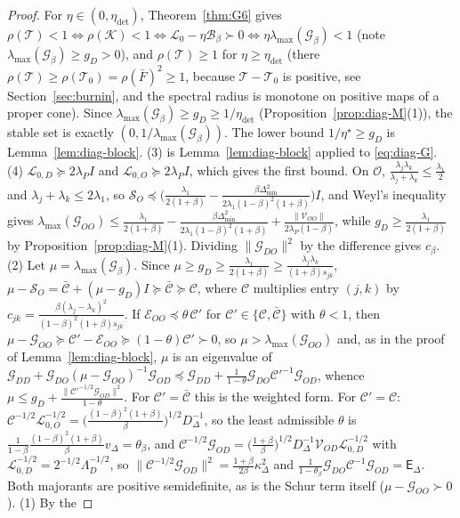 \documentclass[11pt]{article}
\theoremstyle{remark}
\begin{document}
\begin{proof}
For $\eta\in(0,\eta_{\mathrm{det}})$, Theorem~\ref{thm:G6} gives $\rho(\mathcal T)<1\iff\rho(\mathcal K)<1\iff\mathcal L_0-\eta\mathcal B_\beta\succ0\iff\eta\lambda_{\max}(\mathcal G_\beta)<1$ (note $\lambda_{\max}(\mathcal G_\beta)\ge g_D>0$), and $\rho(\mathcal T)\ge1$ for $\eta\ge\eta_{\mathrm{det}}$ (there $\rho(\mathcal T)\ge\rho(\mathcal T_0)=\rho(\bar F)^2\ge1$, because $\mathcal T-\mathcal T_0$ is positive, see Section~\ref{sec:burnin}, and the spectral radius is monotone on positive maps of a proper cone). Since $\lambda_{\max}(\mathcal G_\beta)\ge g_D\ge1/\eta_{\mathrm{det}}$ (Proposition~\ref{prop:diag-M}(1)), the stable set is exactly $(0,1/\lambda_{\max}(\mathcal G_\beta))$. The lower bound $1/\eta^\star\ge g_D$ is Lemma~\ref{lem:diag-block}. (3) is Lemma~\ref{lem:diag-block} applied to \eqref{eq:diag-G}. (4) $\mathcal L_{0,D}\succeq2\lambda_PI$ and $\mathcal L_{0,O}\succeq2\lambda_PI$, which gives the first bound. On $\mathcal O$, $\frac{\lambda_j\lambda_k}{\lambda_j+\lambda_k}\le\frac{\lambda_1}2$ and $\lambda_j+\lambda_k\le2\lambda_1$, so $\mathcal S_O\preceq\big(\frac{\lambda_1}{2(1+\beta)}-\frac{\beta\Delta_{\min}^2}{2\lambda_1(1-\beta)^2(1+\beta)}\big)I$, and Weyl's inequality gives $\lambda_{\max}(\mathcal G_{OO})\le\frac{\lambda_1}{2(1+\beta)}-\frac{\beta\Delta_{\min}^2}{2\lambda_1(1-\beta)^2(1+\beta)}+\frac{\|\mathcal V_{OO}\|}{2\lambda_P(1-\beta)}$, while $g_D\ge\frac{\lambda_1}{2(1+\beta)}$ by Proposition~\ref{prop:diag-M}(1). Dividing $\|\mathcal G_{DO}\|^2$ by the difference gives $c_\beta$. (2) Let $\mu=\lambda_{\max}(\mathcal G_\beta)$. Since $\mu\ge g_D\ge\frac{\lambda_1}{2(1+\beta)}\ge\frac{\lambda_j\lambda_k}{(1+\beta)s_{jk}}$, $\mu-\mathcal S_O=\bar{\mathcal C}+(\mu-g_D)I\succeq\bar{\mathcal C}\succeq\mathcal C$, where $\mathcal C$ multiplies entry $(j,k)$ by $c_{jk}=\frac{\beta(\lambda_j-\lambda_k)^2}{(1-\beta)^2(1+\beta)s_{jk}}$. If $\mathcal E_{OO}\preceq\theta\,\mathcal C'$ for $\mathcal C'\in\{\mathcal C,\bar{\mathcal C}\}$ with $\theta<1$, then $\mu-\mathcal G_{OO}\succeq\mathcal C'-\mathcal E_{OO}\succeq(1-\theta)\mathcal C'\succ0$, so $\mu>\lambda_{\max}(\mathcal G_{OO})$ and, as in the proof of Lemma~\ref{lem:diag-block}, $\mu$ is an eigenvalue of $\mathcal G_{DD}+\mathcal G_{DO}(\mu-\mathcal G_{OO})^{-1}\mathcal G_{OD}\preceq\mathcal G_{DD}+\frac{1}{1-\theta}\mathcal G_{DO}\mathcal C'^{-1}\mathcal G_{OD}$, whence $\mu\le g_D+\frac{\|\mathcal C'^{-1/2}\mathcal G_{OD}\|^2}{1-\theta}$. For $\mathcal C'=\bar{\mathcal C}$ this is the weighted form. For $\mathcal C'=\mathcal C$: $\mathcal C^{-1/2}\mathcal L_{0,O}^{-1/2}=\big(\frac{(1-\beta)^2(1+\beta)}{\beta}\big)^{1/2}D_\Delta^{-1}$, so the least admissible $\theta$ is $\frac{1}{1-\beta}\frac{(1-\beta)^2(1+\beta)}{\beta}v_\Delta=\theta_\beta$, and $\mathcal C^{-1/2}\mathcal G_{OD}=\big(\frac{1+\beta}{\beta}\big)^{1/2}D_\Delta^{-1}\mathcal V_{OD}\mathcal L_{0,D}^{-1/2}$ with $\mathcal L_{0,D}^{-1/2}=2^{-1/2}\Lambda_D^{-1/2}$, so $\|\mathcal C^{-1/2}\mathcal G_{OD}\|^2=\frac{1+\beta}{2\beta}\kappa_\Delta^2$ and $\frac{1}{1-\theta_\beta}\mathcal G_{DO}\mathcal C^{-1}\mathcal G_{OD}=\mathsf E_\Delta$. Both majorants are positive semidefinite, as is the Schur term itself ($\mu-\mathcal G_{OO}\succ0$). (1) By the 
\end{proof}
\end{document}
